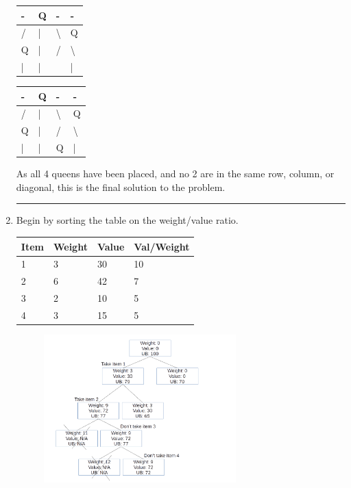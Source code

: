 \documentclass{article}
\begin{document}
\begin{enumerate}
\begin{table}[H]
\begin{tabular}{|l|l|l|l|}
\hline
- & Q & - & - \\ \hline
/ & | & \textbackslash{} & Q \\ \hline
Q & | & / & \textbackslash{} \\ \hline
| & | &  & | \\ \hline
\end{tabular}
\end{table}


\begin{table}[H]
\begin{tabular}{|l|l|l|l|}
\hline
- & Q & - & - \\ \hline
/ & | & \textbackslash{} & Q \\ \hline
Q & | & / & \textbackslash{} \\ \hline
| & | & Q & | \\ \hline
\end{tabular}
\end{table}

As all 4 queens have been placed, and no 2 are in the same row, column, or diagonal, this is the final solution to the problem. 


\noindent\rule{8cm}{0.4pt}

\item Begin by sorting the table on the weight/value ratio. 

\begin{table}[H]
\begin{tabular}{|l|l|l|l|}
\hline
Item & Weight & Value & Val/Weight \\ \hline
1 & 3 & 30 & 10 \\ \hline
2 & 6 & 42 & 7 \\ \hline
3 & 2 & 10 & 5 \\ \hline
4 & 3 & 15 & 5 \\ \hline
\end{tabular}
\end{table}


\begin{figure}[H]
        \centering
	\includegraphics[width=0.7\textwidth]{P8/branchandbound}
\end{figure}


\end{enumerate}
\end{document}
